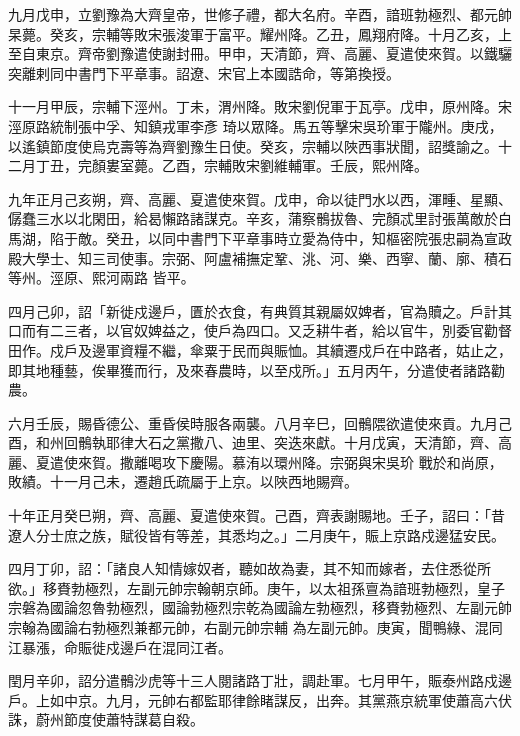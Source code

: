 \begin{pinyinscope}
 九月戊申，立劉豫為大齊皇帝，世修子禮，都大名府。辛酉，諳班勃極烈、都元帥杲薨。癸亥，宗輔等敗宋張浚軍于富平。耀州降。乙丑，鳳翔府降。十月乙亥，上至自東京。齊帝劉豫遣使謝封冊。甲申，天清節，齊、高麗、夏遣使來賀。以鐵驪突離剌同中書門下平章事。詔遼、宋官上本國誥命，等第換授。



 十一月甲辰，宗輔下涇州。丁未，渭州降。敗宋劉倪軍于瓦亭。戊申，原州降。宋涇原路統制張中孚、知鎮戎軍李彥
 琦以眾降。馬五等擊宋吳玠軍于隴州。庚戌，以遙鎮節度使烏克壽等為齊劉豫生日使。癸亥，宗輔以陜西事狀聞，詔獎諭之。十二月丁丑，完顏婁室薨。乙酉，宗輔敗宋劉維輔軍。壬辰，熙州降。



 九年正月己亥朔，齊、高麗、夏遣使來賀。戊申，命以徒門水以西，渾畽、星顯、僝蠢三水以北閑田，給曷懶路諸謀克。辛亥，蒲察鶻拔魯、完顏忒里討張萬敵於白馬湖，陷于敵。癸丑，以同中書門下平章事時立愛為侍中，知樞密院張忠嗣為宣政殿大學士、知三司使事。宗弼、阿盧補撫定鞏、洮、河、樂、西寧、蘭、廓、積石等州。涇原、熙河兩路
 皆平。



 四月己卯，詔「新徙戍邊戶，匱於衣食，有典質其親屬奴婢者，官為贖之。戶計其口而有二三者，以官奴婢益之，使戶為四口。又乏耕牛者，給以官牛，別委官勸督田作。戍戶及邊軍資糧不繼，傘粟于民而與賑恤。其續遷戍戶在中路者，姑止之，即其地種藝，俟畢獲而行，及來春農時，以至戍所。」五月丙午，分遣使者諸路勸農。



 六月壬辰，賜昏德公、重昏侯時服各兩襲。八月辛巳，回鶻隈欲遣使來貢。九月己酉，和州回鶻執耶律大石之黨撒八、迪里、突迭來獻。十月戊寅，天清節，齊、高麗、夏遣使來賀。撒離喝攻下慶陽。慕洧以環州降。宗弼與宋吳玠
 戰於和尚原，敗績。十一月己未，遷趙氏疏屬于上京。以陜西地賜齊。



 十年正月癸巳朔，齊、高麗、夏遣使來賀。己酉，齊表謝賜地。壬子，詔曰：「昔遼人分士庶之族，賦役皆有等差，其悉均之。」二月庚午，賑上京路戍邊猛安民。



 四月丁卯，詔：「諸良人知情嫁奴者，聽如故為妻，其不知而嫁者，去住悉從所欲。」移賚勃極烈，左副元帥宗翰朝京師。庚午，以太祖孫亶為諳班勃極烈，皇子宗磐為國論忽魯勃極烈，國論勃極烈宗乾為國論左勃極烈，移賚勃極烈、左副元帥宗翰為國論右勃極烈兼都元帥，右副元帥宗輔
 為左副元帥。庚寅，聞鴨綠、混同江暴漲，命賑徙戍邊戶在混同江者。



 閏月辛卯，詔分遣鶻沙虎等十三人閱諸路丁壯，調赴軍。七月甲午，賑泰州路戍邊戶。上如中京。九月，元帥右都監耶律餘睹謀反，出奔。其黨燕京統軍使蕭高六伏誅，蔚州節度使蕭特謀葛自殺。




\end{pinyinscope}
